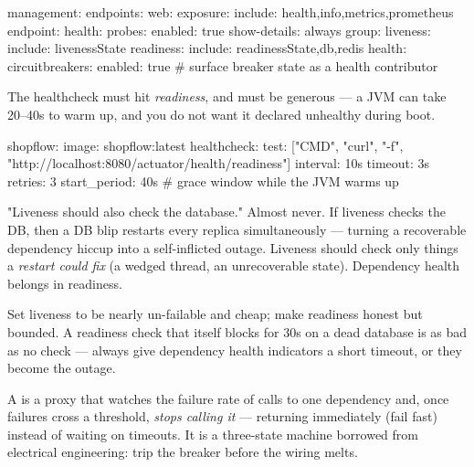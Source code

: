 \begin{yamlbox}
management:
  endpoints:
    web:
      exposure:
        include: health,info,metrics,prometheus
  endpoint:
    health:
      probes:
        enabled: true
      show-details: always
      group:
        liveness:
          include: livenessState
        readiness:
          include: readinessState,db,redis
  health:
    circuitbreakers:
      enabled: true      # surface breaker state as a health contributor
\end{yamlbox}

 The healthcheck must hit \emph{readiness}, and  must be generous --- a JVM can take 20--40s to warm up, and you do not want it declared unhealthy during boot.

\begin{yamlbox}
  shopflow:
    image: shopflow:latest
    healthcheck:
      test: ["CMD", "curl", "-f",
             "http://localhost:8080/actuator/health/readiness"]
      interval: 10s
      timeout: 3s
      retries: 3
      start_period: 40s     # grace window while the JVM warms up
\end{yamlbox}

\begin{misconception}
"Liveness should also check the database." Almost never. If liveness checks the DB, then a DB blip restarts every replica simultaneously --- turning a recoverable dependency hiccup into a self-inflicted outage. Liveness should check only things a \emph{restart could fix} (a wedged thread, an unrecoverable state). Dependency health belongs in readiness.
\end{misconception}

\begin{prodtip}
Set liveness to be nearly un-failable and cheap; make readiness honest but bounded. A readiness check that itself blocks for 30s on a dead database is as bad as no check --- always give dependency health indicators a short timeout, or they become the outage.
\end{prodtip}


 A  is a proxy that watches the failure rate of calls to one dependency and, once failures cross a threshold, \emph{stops calling it} --- returning immediately (fail fast) instead of waiting on timeouts. It is a three-state machine borrowed from electrical engineering: trip the breaker before the wiring melts.

